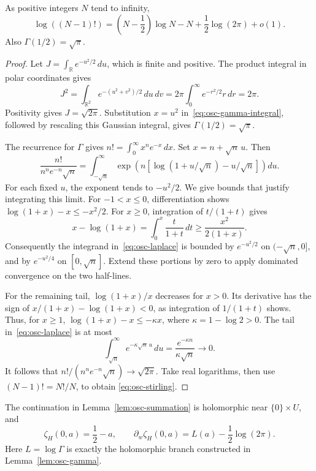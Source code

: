 \begin{lemma}
\label{lem:osc-stirling}
As positive integers \(N\) tend to infinity,
\begin{equation}
 \log((N-1)!)
 =\left(N-\frac12\right)\log N-N
      +\frac12\log(2\pi)+o(1).                    \label{eq:osc-stirling}
\end{equation}
Also \(\Gamma(1/2)=\sqrt\pi\).
\end{lemma}

\begin{proof}
Let \(J=\int_{\mathbb R}e^{-u^2/2}\,du\), which is finite and positive.
The product integral in polar coordinates gives
\[
 J^2=\int_{\mathbb R^2}e^{-(u^2+v^2)/2}\,du\,dv
 =2\pi\int_0^\infty e^{-r^2/2}r\,dr=2\pi.
\]
Positivity gives \(J=\sqrt{2\pi}\).
Substitution \(x=u^2\) in~\eqref{eq:osc-gamma-integral}, followed by
rescaling this Gaussian integral, gives \(\Gamma(1/2)=\sqrt\pi\).

The recurrence for \(\Gamma\) gives \(n!=\int_0^\infty x^n e^{-x}\,dx\).
Set \(x=n+\sqrt n\,u\). Then
\begin{equation}
 \frac{n!}{n^n e^{-n}\sqrt n}
 =\int_{-\sqrt n}^{\infty}
   \exp\left(n\left[\log(1+u/\sqrt n)-u/\sqrt n\right]\right)du.
 \label{eq:osc-laplace}
\end{equation}
For each fixed \(u\), the exponent tends to \(-u^2/2\).
We give bounds that justify integrating this limit.
For \(-1<x\leq0\), differentiation shows
\(\log(1+x)-x\leq-x^2/2\).
For \(x\geq0\), integration of \(t/(1+t)\) gives
\[
 x-\log(1+x)=\int_0^x\frac{t}{1+t}\,dt
 \geq\frac{x^2}{2(1+x)}.
\]
Consequently the integrand in~\eqref{eq:osc-laplace} is bounded by
\(e^{-u^2/2}\) on \((-\sqrt n,0]\), and by \(e^{-u^2/4}\) on
\([0,\sqrt n]\). Extend these portions by zero to apply dominated
convergence on the two half-lines.

For the remaining tail, \(\log(1+x)/x\) decreases for \(x>0\).
Its derivative has the sign of
\(x/(1+x)-\log(1+x)<0\), as integration of \(1/(1+t)\) shows.
Thus, for \(x\geq1\),
\(\log(1+x)-x\leq-\kappa x\), where \(\kappa=1-\log2>0\).
The tail in~\eqref{eq:osc-laplace} is at most
\[
 \int_{\sqrt n}^{\infty}e^{-\kappa\sqrt n\,u}\,du
 =\frac{e^{-\kappa n}}{\kappa\sqrt n}\longrightarrow0.
\]
It follows that \(n!/(n^n e^{-n}\sqrt n)\to\sqrt{2\pi}\).
Take real logarithms, then use \((N-1)!=N!/N\), to obtain
\eqref{eq:osc-stirling}.
\end{proof}

\begin{proposition}
\label{prop:osc-hurwitz-values}
The continuation in Lemma~\ref{lem:osc-summation} is holomorphic near
\(\{0\}\times U\), and
\begin{equation}
 \zeta_H(0,a)=\frac12-a,\qquad
 \partial_w\zeta_H(0,a)=L(a)-\frac12\log(2\pi).
 \label{eq:osc-hurwitz-values}
\end{equation}
Here \(L=\log\Gamma\) is exactly the holomorphic branch constructed in
Lemma~\ref{lem:osc-gamma}.
\end{proposition}

